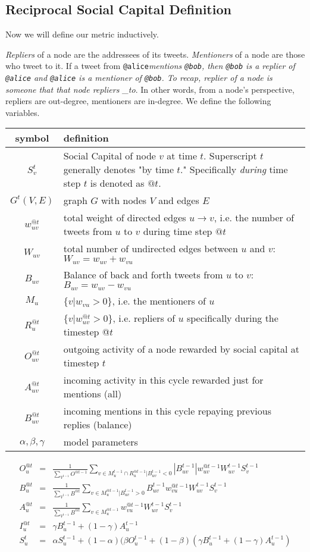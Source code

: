 \documentclass[10pt,oneside]{memoir}
\begin{document}
\pagebreak \subsection{Reciprocal Social Capital Definition}
\label{reciprocalsocialcapitaldefinition}

Now we will define our metric inductively.


{\itshape Repliers} of a node are the addressees of its tweets. {\itshape Mentioners} of a node are those who tweet to it. If a tweet from \texttt{@alice}{\itshape mentions \texttt{@bob}, then \texttt{@bob} is a replier of \texttt{@alice} and \texttt{@alice} is a mentioner of \texttt{@bob}. To recap, replier of a node is someone that that node repliers \_to}. In other words, from a node's perspective, repliers are out-degree, mentioners are in-degree.  We define the following variables.



\begin{tabular}{|c|p{4in}|}
\hline 
symbol & definition\tabularnewline
\hline
\hline 
$S_{v}^{t}$ & Social Capital of node $v$ at time $t$. Superscript $t$ generally
denotes "by time $t$." Specifically \emph{during} time step
$t$ is denoted as $@t$.\tabularnewline
\hline 
$G^{t}(V,E)$ & graph $G$ with nodes $V$ and edges $E$\tabularnewline
\hline 
$w_{uv}^{@t}$ & total weight of directed edges $u\rightarrow v$, i.e. the number
of tweets from $u$ to $v$ during time step $@t$\tabularnewline
\hline 
$W_{uv}$ & total number of undirected edges between $u$ and $v$: $W_{uv}=w_{uv}+w_{vu}$\tabularnewline
\hline 
$B_{uv}$ & Balance of back and forth tweets from $u$ to $v$: $B_{uv}=w_{uv}-w_{vu}$\tabularnewline
\hline 
$M_{u}$ & $\{v|w_{vu}>0\}$, i.e. the mentioners of $u$\tabularnewline
\hline 
$R_{u}^{@t}$ & $\{v|w_{uv}^{@t}>0\}$, i.e. repliers of $u$ specifically during
the timestep @$t$\tabularnewline
\hline 
$O_{uv}^{@t}$ & outgoing activity of a node rewarded by social capital at timestep
$t$\tabularnewline
\hline 
$A_{uv}^{@t}$ & incoming activity in this cycle rewarded just for mentions (all)\tabularnewline
\hline 
$B_{uv}^{@t}$ & incoming mentions in this cycle repaying previous replies (balance)\tabularnewline
\hline 
$\alpha,\beta,\gamma$ & model parameters\tabularnewline
\hline
\end{tabular}
\begin{eqnarray}
O_{u}^{@t} & = & \frac{1}{\sum_{V^{t-1}}O^{@t-1}}\sum_{v\in M_{u}^{t-1}\cap R_{u}^{@t-1}|B_{uv}^{t-1}<0}|B_{uv}^{t-1}|w_{uv}^{@t-1}W_{uv}^{t-1}S_{v}^{t-1}\\
B_{u}^{@t} & = & \frac{1}{\sum_{V^{t-1}}B^{@t}}\sum_{v\in M_{u}^{@t-1}|B_{uv}^{t-1}>0}B_{uv}^{t-1}w_{vu}^{@t-1}W_{uv}^{t-1}S_{v}^{t-1}\\
A_{u}^{@t} & = & \frac{1}{\sum_{V^{t-1}}B^{@t}}\sum_{v\in M_{u}^{@t-1}}w_{vu}^{@t-1}W_{uv}^{t-1}S_{v}^{t-1}\\
I_{u}^{@t} & = & \gamma B_{u}^{t-1}+(1-\gamma)A_{u}^{t-1}\\
S_{u}^{t} & = & \alpha S_{u}^{t-1}+(1-\alpha)(\beta O_{u}^{t-1}+(1-\beta)(\gamma B_{u}^{t-1}+(1-\gamma)A_{u}^{t-1})
\end{eqnarray}
\end{document}

